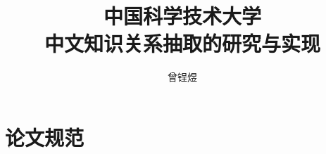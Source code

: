\documentclass[bachelor]{ustcthesis}
\title{中国科学技术大学\\中文知识关系抽取的研究与实现}
\author{曾锃煜}
\begin{document}
\maketitle

%
%
%

\frontmatter

\tableofcontents
\listoffigures
\listoftables
\listofalgorithms  %


\mainmatter







\appendix
\chapter{论文规范}
\end{document}
